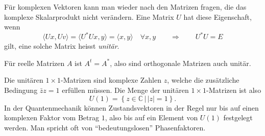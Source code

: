 Für komplexen Vektoren kann man wieder nach den Matrizen fragen, die das
komplexe Skalarprodukt nicht verändern. Eine Matrix $U$ hat diese
Eigenschaft, wenn
\[
\langle Ux,Uv\rangle=\langle U^*Ux,y\rangle=\langle x,y\rangle\quad\forall x,y
\qquad\Rightarrow\qquad
U^*U=E
\]
gilt,
eine solche Matrix heisst {\em unitär}. 

Für reelle Matrizen $A$ ist $A^t=A^*$, also sind orthogonale Matrizen
auch unitär.

\begin{beispiel}
Die unitären $1\times 1$-Matrizen sind komplexe Zahlen $z$, welche
die zusätzliche Bedingung $\bar zz=1$ erfüllen müssen.
Die Menge der unitären $1\times 1$-Matrizen ist also
\[
U(1)=\left\{ z\in\mathbb C\,|\, |z|=1
\right\}.
\]
In der Quantenmechanik können Zustandsvektoren in der Regel nur bis auf
einen komplexen Faktor vom Betrag $1$, also bis auf ein Element
von $U(1)$ festgelegt werden.
Man spricht oft von ``bedeutungslosen'' Phasenfaktoren.
\end{beispiel}

